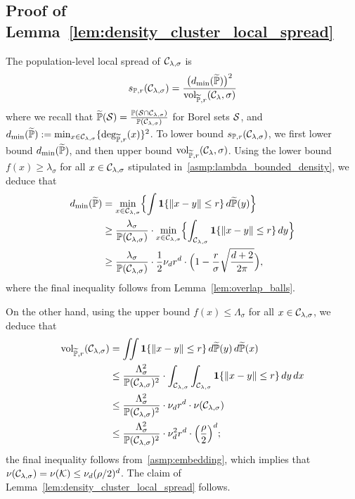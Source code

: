 \subsection{Proof of Lemma~\ref{lem:density_cluster_local_spread}}
\label{subsec:density_cluster_local_spread}
The population-level local spread of $\mathcal{C}_{\lambda,\sigma}$ is
\begin{equation*}
s_{\mathbb{P},r}(\mathcal{C}_{\lambda,\sigma}) = \frac{\bigl(d_{\min}(\widetilde{\mathbb{P}})\bigr)^2}{\mathrm{vol}_{\widetilde{\mathbb{P}},r}(\mathcal{C}_{\lambda},\sigma)}
\end{equation*}
where we recall that $\widetilde{\mathbb{P}}(\mathcal{S}) = \frac{\mathbb{P}(\mathcal{S} \cap \mathcal{C}_{\lambda,\sigma})}{\mathbb{P}(\mathcal{C}_{\lambda,\sigma})}$ for Borel sets $\mathcal{S}$, and $d_{\min}(\widetilde{\mathbb{P}}) := \min_{x \in \mathcal{C}_{\lambda,\sigma}}\{\deg_{\widetilde{\mathbb{P}},r}(x)\}^2$. To lower bound $s_{\mathbb{P},r}(\mathcal{C}_{\lambda,\sigma})$, we first lower bound $d_{\min}(\widetilde{\mathbb{P}})$, and then upper bound $\mathrm{vol}_{\widetilde{\mathbb{P}},r}(\mathcal{C}_{\lambda},\sigma)$. Using the lower bound $f(x) \geq \lambda_{\sigma}$ for all $x \in \mathcal{C}_{\lambda,\sigma}$ stipulated in~\ref{asmp:lambda_bounded_density}, we deduce that
\begin{align*}
d_{\min}(\widetilde{\mathbb{P}}) & = \min_{x \in \mathcal{C}_{\lambda,\sigma}} \Bigl\{ \int \mathbf{1}\{\|x - y\| \leq r\} \,d\widetilde{\mathbb{P}}(y) \Bigr\} \\
& \geq \frac{\lambda_{\sigma}}{\mathbb{P}(\mathcal{C}_{\lambda,\sigma})} \cdot \min_{x \in \mathcal{C}_{\lambda,\sigma}} \Bigl\{ \int_{\mathcal{C}_{\lambda,\sigma}} \mathbf{1}\{\|x - y\| \leq r\} \,dy \Bigr\} \\
& \geq \frac{\lambda_{\sigma}}{\mathbb{P}(\mathcal{C}_{\lambda,\sigma})} \cdot \frac{1}{2}\nu_dr^d \cdot \Bigl(1 - \frac{r}{\sigma} \sqrt{\frac{d + 2}{2\pi}}\Bigr),
\end{align*}
where the final inequality follows from Lemma~\ref{lem:overlap_balls}. 

On the other hand, using the upper bound $f(x) \leq \Lambda_{\sigma}$ for all $x \in \mathcal{C}_{\lambda,\sigma}$, we deduce that
\begin{align*}
\mathrm{vol}_{\widetilde{\mathbb{P}},r}(\mathcal{C}_{\lambda,\sigma}) & = \iint \mathbf{1}\{\|x - y\|\leq r\} \,d\widetilde{\mathbb{P}}(y) \,d\widetilde{\mathbb{P}}(x) \\
& \leq \frac{\Lambda_{\sigma}^2}{\mathbb{P}(\mathcal{C}_{\lambda,\sigma})^2} \cdot \int_{\mathcal{C}_{\lambda,\sigma}} \int_{\mathcal{C}_{\lambda,\sigma}} \mathbf{1}\{\|x - y\|\leq r\} \,dy \,dx \\
& \leq \frac{\Lambda_{\sigma}^2}{\mathbb{P}(\mathcal{C}_{\lambda,\sigma})^2} \cdot \nu_d r^d \cdot \nu(\mathcal{C}_{\lambda,\sigma}) \\
& \leq \frac{\Lambda_{\sigma}^2}{\mathbb{P}(\mathcal{C}_{\lambda,\sigma})^2} \cdot \nu_d^2 r^d  \cdot \Bigl(\frac{\rho}{2}\Bigr)^d;
\end{align*}
the final inequality follows from~\ref{asmp:embedding}, which implies that $\nu(\mathcal{C}_{\lambda,\sigma}) = \nu(\mathcal{K}) \leq \nu_d(\rho/2)^d$. The claim of Lemma~\ref{lem:density_cluster_local_spread} follows.

